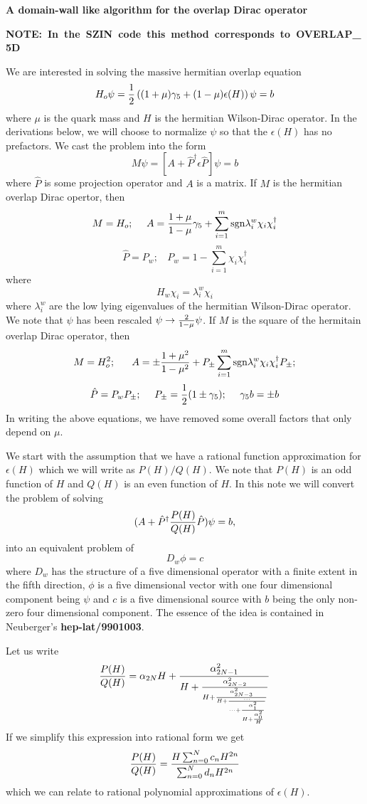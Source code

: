 
\centerline{ \bf A domain-wall like algorithm for the overlap Dirac operator}
\medskip

\hbox{\bf NOTE: In the SZIN code this method corresponds to OVERLAP\_5D}

\medskip

We are interested in solving the massive hermitian overlap equation
$$
H_o\psi = {1\over 2}\left((1+\mu)\gamma_5 + (1-\mu)\epsilon(H)\right)\psi = b
$$
where $\mu$ is the quark mass and $H$ is the hermitian Wilson-Dirac operator.
In the derivations below, we will choose to normalize $\psi$ so that
the $\epsilon(H)$ has no prefactors. We cast the problem into the form
$$
M \psi = [ A + \hat P^\dagger \epsilon \hat P ] \psi = b
$$
where $\hat P$ is some projection operator and $A$ is a matrix.
If $M$ is the hermitian overlap Dirac opertor, then
$$M=H_o;\ \ \ \  A= {1+\mu\over 1-\mu} \gamma_5 + 
\sum_{i=1}^m {\rm sgn}{\lambda^w_i} \chi_i \chi_i^\dagger$$
$$
\hat P = P_w;\ \ \ \  P_w= 1-\sum_{i=1}^m \chi_i \chi_i^\dagger
$$
where
$$H_w \chi_i = \lambda^w_i \chi_i$$
where $\lambda^w_i$ are the low lying eigenvalues of the hermitian
Wilson-Dirac operator.
We note that $\psi$ has been rescaled $\psi\rightarrow {{2}\over{1-\mu}}\psi$.
If $M$ is the square of the hermitain overlap Dirac operator, then
$$M=H_o^2; \ \ \ \ \  A = \pm {1+ \mu^2\over 1-\mu^2} 
+ P_\pm \sum_{i=1}^m {\rm sgn}{\lambda^w_i} \chi_i \chi_i^\dagger P_\pm;$$
$$
\hat P = P_w P_\pm; \ \ \ \
P_\pm = {1\over 2} (1 \pm \gamma_5); \ \ \ \ \gamma_5 b = \pm b $$
In writing the above equations, we have removed some overall factors
that only depend on $\mu$. 
 
We start with the assumption that we have a rational function 
approximation for $\epsilon(H)$ which we will write as
$P(H)/Q(H)$. We note that $P(H)$ is an odd function of $H$
and $Q(H)$ is an even function of $H$. In this note we will
convert the problem of solving
$$
(A + \hat P^\dagger {P(H)\over Q(H)} \hat P ) \psi = b,
$$
into an equivalent problem of 
$$D_w \phi = c$$
where $D_w$ has the structure of a five dimensional operator with
a finite extent in the fifth direction,
$\phi$ is a five dimensional vector with one four dimensional
component being $\psi$ and $c$ is a five dimensional source with
$b$ being the only non-zero four dimensional component. 
The essence of the idea is contained in Neuberger's {\bf hep-lat/9901003}.

Let us write
$$
{P(H)\over Q(H)} = \alpha_{2N} H + { \alpha^2_{2N-1} \over 
                        H + {\alpha^2_{2N-2} \over
                        H + {\alpha^2_{2N-3} \over
                        H + {\cdots \over
                   \cdots + {\alpha^2_1 \over
                        H + {\alpha^2_0 \over
                        H   }}}}}}
$$
If we simplify this expression into rational form we get 
$$
{P(H)\over Q(H)}  = { H \sum_{n=0}^N c_n H^{2n} \over \sum_{n=0}^N d_n H^{2n}}
$$
which we can relate to rational polynomial approximations of $\epsilon(H)$.

